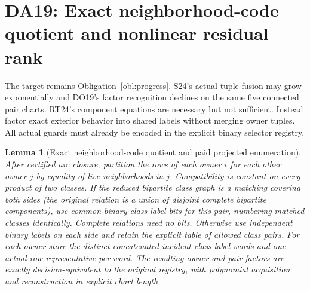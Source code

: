 \documentclass[11pt]{article}
\newtheorem{lemma}[theorem]{Lemma}
\begin{document}
\section{DA19: Exact neighborhood-code quotient and nonlinear residual rank}\label{sec:da19}
The target remains Obligation~\ref{obl:progress}. S24's actual tuple fusion may grow exponentially and DO19's factor recognition declines on the same five connected pair charts. RT24's component equations are necessary but not sufficient. Instead factor exact exterior behavior into shared labels without merging owner tuples. All actual guards must already be encoded in the explicit binary selector registry.
\begin{lemma}[Exact neighborhood-code quotient and paid projected enumeration]\label{lem:da19-code}
After certified arc closure, partition the rows of each owner $i$ for each other owner $j$ by equality of live neighborhoods in $j$. Compatibility is constant on every product of two classes. If the reduced bipartite class graph is a matching covering both sides (the original relation is a union of disjoint complete bipartite components), use common binary class-label bits for this pair, numbering matched classes identically. Complete relations need no bits. Otherwise use independent binary labels on each side and retain the explicit table of allowed class pairs. For each owner store the distinct concatenated incident class-label words and one actual row representative per word. The resulting owner and pair factors are exactly decision-equivalent to the original registry, with polynomial acquisition and reconstruction in explicit chart length.
\end{lemma}
\end{document}
